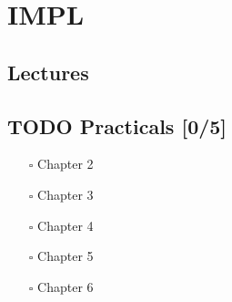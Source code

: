 \documentclass[11pt]{article}
\begin{document}
\section{IMPL}
\label{sec:org513935d}
\subsection{Lectures}
\label{sec:org0596e9d}
\subsection{{\bfseries\sffamily TODO} Practicals [0/5]}
\label{sec:org02db825}
\begin{itemize}
\item[{$\square$}] Chapter 2
\item[{$\square$}] Chapter 3
\item[{$\square$}] Chapter 4
\item[{$\square$}] Chapter 5
\item[{$\square$}] Chapter 6
\end{itemize}
\end{document}
